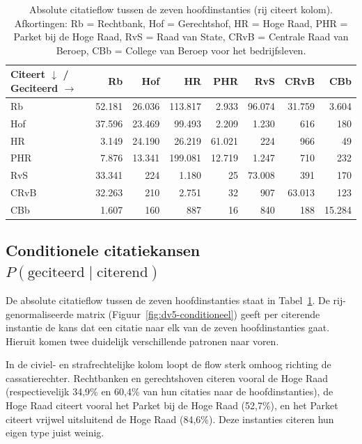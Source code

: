 \documentclass[a4paper, 12pt]{report}
\begin{document}
\begin{table}[H]
  \centering
  \caption{Absolute citatieflow tussen de zeven hoofdinstanties (rij citeert kolom). Afkortingen: Rb = Rechtbank, Hof = Gerechtshof, HR = Hoge Raad, PHR = Parket bij de Hoge Raad, RvS = Raad van State, CRvB = Centrale Raad van Beroep, CBb = College van Beroep voor het bedrijfsleven.}
  \label{tab:dv5-flow-abs}
  \footnotesize
  \begin{tabular}{lrrrrrrr}
    \toprule
    Citeert $\downarrow$ / Geciteerd $\rightarrow$ & Rb & Hof & HR & PHR & RvS & CRvB & CBb \\
    \midrule
    Rb   & 52.181 & 26.036 & 113.817 & 2.933   & 96.074 & 31.759 & 3.604 \\
    Hof  & 37.596 & 23.469 & 99.493  & 2.209   & 1.230  & 616    & 180 \\
    HR   & 3.149  & 24.190 & 26.219  & 61.021  & 224    & 966    & 49 \\
    PHR  & 7.876  & 13.341 & 199.081 & 12.719  & 1.247   & 710    & 232 \\
    RvS  & 33.341 & 224    & 1.180   & 25      & 73.008 & 391    & 170 \\
    CRvB & 32.263 & 210    & 2.751   & 32      & 907    & 63.013 & 123 \\
    CBb  & 1.607  & 160    & 887     & 16      & 840    & 188    & 15.284 \\
    \bottomrule
  \end{tabular}
\end{table}



\subsection{Conditionele citatiekansen $P(\text{geciteerd} \mid \text{citerend})$}
De absolute citatieflow tussen de zeven hoofdinstanties staat in Tabel~\ref{tab:dv5-flow-abs}. De rij-genormaliseerde matrix (Figuur~\ref{fig:dv5-conditioneel}) geeft per citerende instantie de kans dat een citatie naar elk van de zeven hoofdinstanties gaat. Hieruit komen twee duidelijk verschillende patronen naar voren.

In de civiel- en strafrechtelijke kolom loopt de flow sterk omhoog richting de cassatierechter. Rechtbanken en gerechtshoven citeren vooral de Hoge Raad (respectievelijk 34,9\% en 60,4\% van hun citaties naar de hoofdinstanties), de Hoge Raad citeert vooral het Parket bij de Hoge Raad (52,7\%), en het Parket citeert vrijwel uitsluitend de Hoge Raad (84,6\%). Deze instanties citeren hun eigen type juist weinig.
\end{document}
